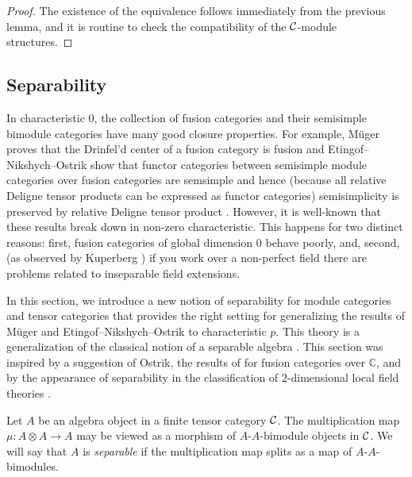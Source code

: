 \documentclass{amsart}
\begin{document}
\begin{proof}
	The existence of the equivalence follows immediately from the previous lemma, and it is routine to check the compatibility of the $\mathcal C$-module structures.  
\end{proof}



\subsection{Separability} \label{sec:tc-separable}
In characteristic $0$, the collection of fusion categories and their semisimple bimodule categories have many good closure properties.  For example, M\"uger proves that the Drinfel'd center  of a fusion category is fusion \cite[Theorem 3.16]{MR1966525} and Etingof--Nikshych--Ostrik show that functor categories between semisimple module categories over fusion categories are semsimple and hence (because all relative Deligne tensor products can be expressed as functor categories) semisimplicity is preserved by relative Deligne tensor product \cite[Theorem 2.16]{MR2183279}.  However, it is well-known that these results break down in non-zero characteristic.  This happens for two distinct reasons: first, fusion categories of global dimension $0$ behave poorly, and, second, (as observed by Kuperberg \cite[Question 5.1]{MR1995781}) if you work over a non-perfect field there are problems related to inseparable field extensions.

In this section, we introduce a new notion of separability for module categories and tensor categories that provides the right setting for generalizing the results of M\"uger and Etingof--Nikshych--Ostrik to characteristic $p$.  This theory is a generalization of the classical notion of a separable algebra \cite{???}.   This section was inspired by a suggestion of Ostrik, the results of \cite[\S 2.4]{1009.2117} for fusion categories over $\mathbb{C}$, and by the appearance of separability in the classification of $2$-dimensional local field theories \cite{schommer-pries-thesis}.

\begin{definition}
	Let $A$ be an algebra object in a finite tensor category $\mathcal C$. The multiplication map $\mu: A \otimes A \to A$ may be viewed as a morphism of $A$-$A$-bimodule objects in $\mathcal C$. We will say that $A$ is {\em separable} if the multiplication map splits as a map of $A$-$A$-bimodules. 
\end{definition}
\end{document}

